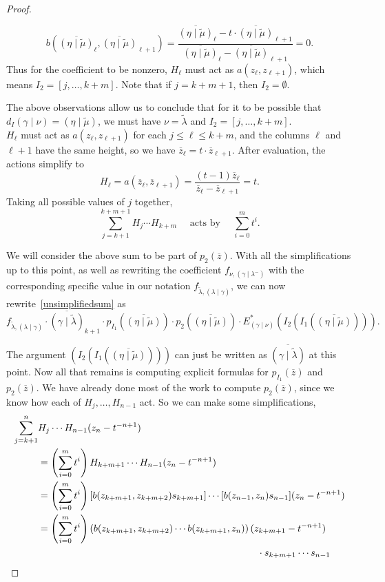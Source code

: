 \documentclass[ALCO]{cedram}
\newcommand{\Estar}[1]{E^*_{#1}}
\newcommand{\nudom}{{( \lambda \mid \gamma )}}
\newcommand{\lambdagamma}{{\nudom}}
\newcommand{\gammalambdamin}{{(\gamma \mid \lambda^-)}}
\newcommand{\gammanu}{{(\gamma \mid \nu)}}
\newcommand{\lambdatilde}{{\widetilde{\lambda}}}
\newcommand{\gammalambdatilde}{{(\gamma \mid \lambdatilde)}}
\newcommand{\flambdatilde}{f_{\lambdatilde , \lambdagamma}}
\newcommand{\etamutilde}{{(\eta \mid \widetilde{\mu})}}
\newcommand{\pIone}{p_{I_1}(\overline{z})}
\newcommand{\pIoneevaluated}{p_{I_1}\left(\overline{\etamutilde}\right)}
\newcommand{\pItwo}{p_{2}(\overline{z})}
\newcommand{\pItwoevaluated}{p_{2}\left(\overline{\etamutilde}\right)}
\newcommand{\dI}{d_I}
\begin{document}
\begin{proof}
\begin{itemize}
    \[b\left(\overline{\etamutilde}_{\ell}, \overline{\etamutilde}_{\ell+1} \right) =\frac{\overline{\etamutilde}_\ell- t\cdot \overline{\etamutilde}_{\ell+1}}{\overline{\etamutilde}_\ell- \overline{\etamutilde}_{\ell+1}} = 0.\] Thus for the coefficient to be nonzero, $H_\ell$ must act as $a(z_\ell,z_{\ell+1})$, which means $I_2 = [j, \dotsc, k+m]$. Note that if $j=k+m+1$, then $I_2 = \emptyset$.
\end{itemize}



The above observations allow us to conclude that for it to be possible that $\dI \gammanu = \etamutilde$, we must have $\nu = \lambdatilde$ and $I_2 = [j, \dotsc, k+m]$. \\

$H_\ell$ must act as $a(z_\ell,z_{\ell+1})$ for each $j \leq \ell \leq k+m$, and the columns $\ell$ and $\ell+1$ have the same height, so we have $\overline{z}_\ell=t\cdot \overline{z}_{\ell+1}$. After evaluation, the actions simplify to
\[ H_\ell = a(\overline{z}_\ell, \overline{z}_{\ell+1}) = \frac{(t-1) \overline{z}_\ell}{\overline{z}_\ell-\overline{z}_{\ell+1}} = t.\]
Taking all possible values of $j$ together,
\[ \sum_{j={k+1}}^{k+m+1} H_j \dotsm H_{k+m}\quad  \text{ acts by }\quad \sum_{i=0}^{m} t^i.\]

We will consider the above sum to be part of $\pItwo$. With all the simplifications up to this point, as well as rewriting the coefficient $f_{\nu, \gammalambdamin}$ with the corresponding specific value in our notation $f_{\lambdatilde, \lambdagamma}$, we can now rewrite~\eqref{unsimplifiedsum} as
\[ \flambdatilde \cdot \overline{\gammalambdatilde}_{k+1} \cdot    \pIoneevaluated \cdot \pItwoevaluated \cdot \Estar{\gammanu}\left(I_2\left(I_1\left(\overline{\etamutilde}\right)\right)\right).\]

The argument $\left(I_2\left(I_1\left(\overline{\etamutilde}\right)\right) \right)$ can just be written as $\overline{\gammalambdatilde}$ at this point. Now all that remains is computing explicit formulas for $\pIone$ and $\pItwo$. We have already done most of the work to compute $\pItwo$, since we know how each of $H_j,\dots, H_{n-1}$ act. So we can make some simplifications, \begin{align*}\sum_{j=k+1}^n &H_j \dotsm H_{n-1}(z_n-t^{-n+1})\\
  &= \left( \sum_{i=0}^{m} t^i \right) H_{k+m+1} \dotsm H_{n-1} (z_n-t^{-n+1}) \\
&= \left( \sum_{i=0}^{m} t^i \right)[b(z_{k+m+1},z_{k+m+2}) s_{k+m+1}] \dotsm [b(z_{n-1},z_n) s_{n-1}](z_n-t^{-n+1}) \\
&= \left( \sum_{i=0}^{m} t^i \right)\left(b(z_{k+m+1},z_{k+m+2}) \dotsm b(z_{k+m+1}, z_{n})\right) (z_{k+m+1}-t^{-n+1}) \\ &\hspace*{8cm} \cdot s_{k+m+1} \dotsm s_{n-1}\end{align*}


\end{proof}
\end{document}
